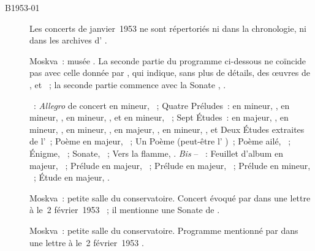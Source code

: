 \begin{description}
 \item[B1953-01]
 Les concerts de janvier~1953 ne sont répertoriés ni dans la chronologie, ni
 dans les archives d'\AVizel{} \citep[p.~174]{Nekrasova08}.
 \item[]
 Moskva~: musée \Scriabine{}.
 La seconde partie du programme ci-dessous ne coïncide pas avec celle donnée
 par \citet[p.~174]{Nekrasova08}, qui indique, sans plus de détails, des
 œuvres de \Kabalevski{}, \Rachmaninov{} et \Scriabine{}~; la seconde partie
 commence avec la Sonate , .

 \textsc{\Scriabine{}}~: \emph{Allegro} de concert en \kB \Flat mineur,
 ~; Quatre Préludes~: en \kB \Flat mineur,  ,
 en \kD mineur,  , en \kB \Flat mineur, 
 , et en \kB mineur,  ~; Sept Études~: en \kB
 majeur,  , en \kB \Flat mineur,  , en
 \kF \Sharp mineur,  , en \kF \Sharp majeur, 
 , en \kC \Sharp mineur,  , et Deux Études
 extraites de l'~; Poème en \kC majeur,  ~;
 Un Poème (peut-être l' )~; Poème ailé, 
 ~; Énigme,  ~; Sonate, ~; Vers la
 flamme, .
 \emph{Bis} -- \textsc{\Scriabine{}}~: Feuillet d'album en \kE \Flat majeur,
  ~; Prélude en \kA \Flat majeur,  ~;
 Prélude en \kA \Flat majeur,  ~; Prélude en \kF mineur,
  ~; Étude en \kD \Flat majeur,  .
 \item[]
 Moskva~: petite salle du conservatoire.
 Concert évoqué par \VSofronitsky{} dans une lettre à \AVizel{} le~2
 février~1953 \citep[voir][p.~174]{Nekrasova08}~; il mentionne une Sonate de
 \Glazounov{}.
 \item[]
 Moskva~: petite salle du conservatoire.
 Programme mentionné par \VSofronitsky{} dans une lettre à \AVizel{} le~2
 février~1953 \citep[voir][p.~174]{Nekrasova08}.


\end{description}
